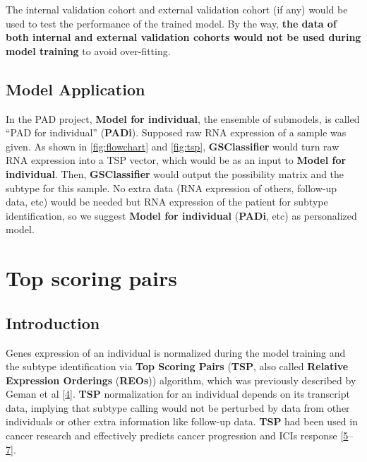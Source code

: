 \documentclass[
  12pt,
]{book}
\begin{document}
The internal validation cohort and external validation cohort (if any) would be used to test the performance of the trained model. By the way, \textbf{the data of both internal and external validation cohorts would not be used during model training} to avoid over-fitting.

\hypertarget{model-application}{%
\subsection{Model Application}\label{model-application}}

In the PAD project, \textbf{Model for individual}, the ensemble of submodels, is called ``PAD for individual'' (\textbf{PADi}). Supposed raw RNA expression of a sample was given. As shown in \ref{fig:flowchart} and \ref{fig:tsp}, \textbf{GSClassifier} would turn raw RNA expression into a TSP vector, which would be as an input to \textbf{Model for individual}. Then, \textbf{GSClassifier} would output the possibility matrix and the subtype for this sample. No extra data (RNA expression of others, follow-up data, etc) would be needed but RNA expression of the patient for subtype identification, so we suggest \textbf{Model for individual} (\textbf{PADi}, etc) as personalized model.

\hypertarget{topicTSP}{%
\section{Top scoring pairs}\label{topicTSP}}

\hypertarget{tsp-intro}{%
\subsection{Introduction}\label{tsp-intro}}

Genes expression of an individual is normalized during the model training and the subtype identification via \textbf{Top Scoring Pairs} (\textbf{TSP}, also called \textbf{Relative Expression Orderings} (\textbf{REOs})) algorithm, which was previously described by Geman et al {[}\protect\hyperlink{ref-RN267}{4}{]}. \textbf{TSP} normalization for an individual depends on its transcript data, implying that subtype calling would not be perturbed by data from other individuals or other extra information like follow-up data. \textbf{TSP} had been used in cancer research and effectively predicts cancer progression and ICIs response {[}\protect\hyperlink{ref-RN265}{5}--\protect\hyperlink{ref-RN261}{7}{]}.
\end{document}
